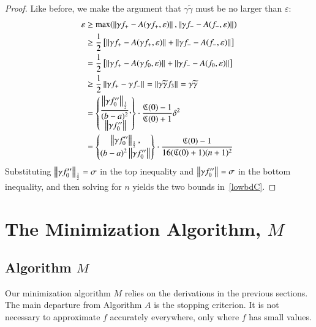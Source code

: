 \documentclass[review]{elsarticle}
\newcommand{\abstol}{\varepsilon}
\theoremstyle{definition}
\newcommand{\tgamma}{\widetilde{\gamma}}
\begin{document}
\begin{proof}
	Like before, we make the argument that $\gamma\tgamma$ must be no larger than
	$\abstol$:
	\begin{align*}
	\abstol & \ge \max(\norm{\gamma f_+-A(\gamma f_+,\abstol)},\norm{\gamma f_--A(f_-, \abstol)}) \\
	& \ge \frac{1}{2} \left[ \norm{\gamma f_+-A(\gamma f_+,\abstol)}+ \norm{\gamma f_--A(f_-, \abstol)} \right] \\
	& = \frac{1}{2} \left[ \norm{\gamma f_+-A(\gamma f_0,\abstol)}+ \norm{\gamma f_--A(f_0, \abstol)} \right] \\
	& \ge \frac{1}{2}  \norm{\gamma f_+ - \gamma f_-} =  \norm{\gamma \tgamma f_3} = \gamma \tgamma\\
	& = \begin{Bmatrix} \displaystyle
	\frac{\norm[\frac 12]{\gamma f_0''}}{(b-a)^2}, \\
	\norm{\gamma f_0''}
	\end{Bmatrix}  \cdot \frac{\fC(0)-1}{\fC(0)+1} \delta^2\\
	& = \begin{Bmatrix} \displaystyle
	\norm[\frac 12]{\gamma f_0''}, \\
	(b-a)^2\norm{\gamma f_0''}
	\end{Bmatrix}  \cdot \frac{\fC(0)-1}{16(\fC(0)+1)(n+1)^2}
	\end{align*}
	Substituting $\norm[\frac12]{\gamma f_0''} = \sigma$ in the top inequality and
	$\norm{\gamma f_0''} = \sigma$ in the bottom inequality, and then solving for
	$n$ yields the two bounds in~\eqref{lowbdC}.
\end{proof}



\section{The Minimization Algorithm, $M$} \label{sec:funmin}

\subsection{Algorithm $M$}  \label{sec:minalgo}
Our minimization algorithm $M$ relies on the derivations in the previous
sections. The main departure from Algorithm $A$ is the stopping criterion. It is
not necessary to approximate $f$ accurately everywhere, only where $f$ has small
values.
\end{document}
